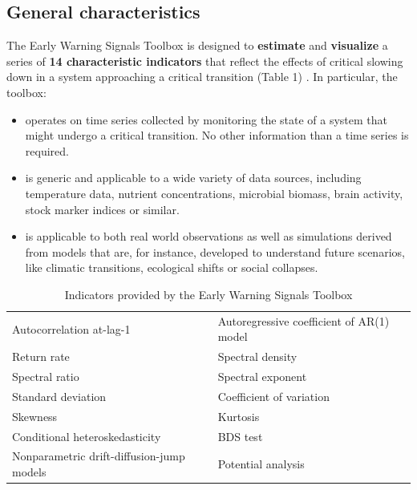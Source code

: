 \documentclass[12pt,a4paper,final]{article}
\begin{document}
\begin{doublespacing}
\subsection{General characteristics}
The Early Warning Signals Toolbox is designed to \textbf{estimate} and \textbf{visualize} a series of \textbf{14 characteristic indicators} that reflect the effects of critical slowing down in a system approaching a critical transition (Table 1) \cite{Dakos2012a}. In particular, the toolbox:
\begin{itemize}
\item operates on time series collected by monitoring the state of a system that might undergo a critical transition. No other information than a time series is required. 
\item is generic and applicable to a wide variety of data sources, including temperature data, nutrient concentrations, microbial biomass, brain activity, stock marker indices or similar.
\item is applicable to both real world observations as well as simulations derived from models that are, for instance, developed to understand future scenarios, like climatic transitions, ecological shifts or social collapses.
\end{itemize}


\begin{table}[h]
\centering
\caption{Indicators provided by the Early Warning Signals Toolbox}%
\begin{tabular}{l l}%
\hline
\hline
Autocorrelation at-lag-1 &	%
Autoregressive coefficient of AR(1) model	\\ %
Return rate &	%
Spectral density \\%
Spectral ratio &	%
Spectral exponent\\	%
Standard deviation &	%
Coefficient of variation\\	%
Skewness &	%
Kurtosis	\\%
Conditional heteroskedasticity	&%
BDS test	\\%
Nonparametric drift-diffusion-jump models	&%
Potential analysis	\\ [0.5ex]%
\hline
\hline
\end{tabular}
\label{methods_table}
\end{table}%


\end{doublespacing}
\end{document}

